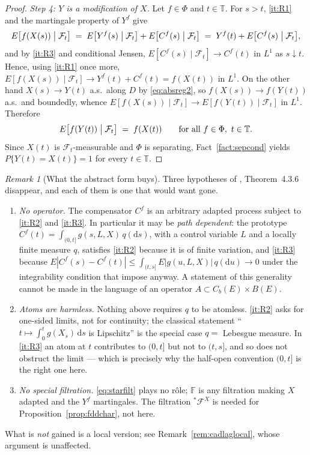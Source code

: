 \documentclass[11pt,a4paper]{article}
\theoremstyle{plain}
\theoremstyle{definition}
\theoremstyle{remark}
\newtheorem{remark}[theorem]{Remark}
\newcommand{\T}{\mathbb{T}}                     %
\newcommand{\Bdd}{B}                           %
\newcommand{\Cb}{C_b}                          %
\newcommand{\Filt}{\mathcal{F}}
\newcommand{\dif}{\,\mathrm{d}}
\newcommand{\EK}{\cite{EK86}}
\newcommand{\CPS}{\cite{CPS23}}
\begin{document}
\begin{proof}
  \emph{Step 4: $Y$ is a modification of $X$.}
  Let $f \in \Phi$ and $t \in \T$.  For $s > t$, \ref{it:R1} and the martingale
  property of $Y^f$ give
  \[
    E\bigl[ f(X(s)) \bigm| \Filt_t \bigr]
      \;=\; E\bigl[ Y^f(s) \bigm| \Filt_t \bigr] + E\bigl[ C^f(s) \bigm| \Filt_t \bigr]
      \;=\; Y^f(t) + E\bigl[ C^f(s) \bigm| \Filt_t \bigr] ,
  \]
  and by \ref{it:R3} and conditional Jensen,
  $E[C^f(s) \mid \Filt_t] \to C^f(t)$ in $L^1$ as $s \downarrow t$.  Hence, using
  \ref{it:R1} once more,
  $E[f(X(s)) \mid \Filt_t] \to Y^f(t) + C^f(t) = f(X(t))$ in $L^1$.  On the other
  hand $X(s) \to Y(t)$ a.s.\ along $D$ by \eqref{eq:absreg2}, so
  $f(X(s)) \to f(Y(t))$ a.s.\ and boundedly, whence
  $E[f(X(s)) \mid \Filt_t] \to E[f(Y(t)) \mid \Filt_t]$ in $L^1$.  Therefore
  \begin{equation}
    \label{eq:absreg3}
    E\bigl[ f(Y(t)) \bigm| \Filt_t \bigr] \;=\; f(X(t))
    \qquad \text{for all } f \in \Phi,\ t \in \T .
  \end{equation}
  Since $X(t)$ is $\Filt_t$-measurable and $\Phi$ is separating,
  Fact~\ref{fact:sepcond} yields $P\{Y(t) = X(t)\} = 1$ for every $t \in \T$.
\end{proof}

\begin{remark}[What the abstract form buys]
  \label{rem:absreggain}
  Three hypotheses of \EK, Theorem~4.3.6 disappear, and each of them is one that
  \CPS{} would want gone.
  \begin{enumerate}[label=(\roman*)]
  \item \emph{No operator.}  The compensator $C^f$ is an arbitrary adapted
    process subject to \ref{it:R2} and \ref{it:R3}.  In particular it may be
    \emph{path dependent}: the \CPS{} prototype
    $C^f(t) = \int_{(0,t]} g(s,L,X)\, q(\mathrm{d}s)$, with a control variable $L$
    and a locally finite measure $q$, satisfies \ref{it:R2} because it is of
    finite variation, and \ref{it:R3} because
    $E|C^f(s) - C^f(t)| \leq \int_{(t,s]} E|g(u,L,X)| \, q(\mathrm{d}u) \to 0$
    under the integrability condition that \CPS{} impose anyway.  A statement of
    this generality cannot be made in the language of an operator
    $A \subset \Cb(E)\times\Bdd(E)$.
  \item \emph{Atoms are harmless.}  Nothing above requires $q$ to be atomless.
    \ref{it:R2} asks for one-sided limits, not for continuity; the classical
    statement ``$t \mapsto \int_0^t g(X_s)\dif s$ is Lipschitz'' is the special
    case $q = $ Lebesgue measure.  In \ref{it:R3} an atom at $t$ contributes to
    $(0,t]$ but not to $(t,s]$, and so does not obstruct the limit --- which is
    precisely why the half-open convention $(0,t]$ is the right one here.
  \item \emph{No special filtration.}  \eqref{eq:starfilt} plays no r\^ole;
    $\mathbb{F}$ is any filtration making $X$ adapted and the $Y^f$ martingales.
    The filtration ${}^{*}\Filt^X$ is needed for
    Proposition~\ref{prop:fddchar}, not here.
  \end{enumerate}
  What is \emph{not} gained is a local version; see
  Remark~\ref{rem:cadlaglocal}, whose argument is unaffected.
\end{remark}
\end{document}
